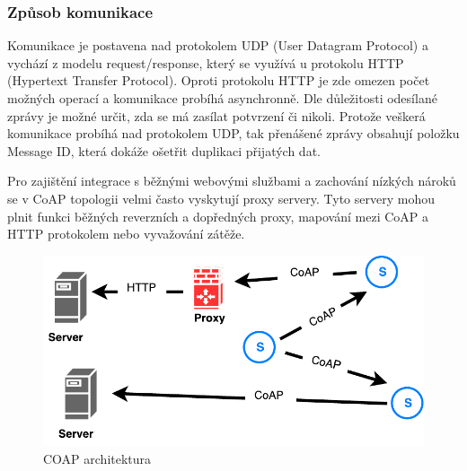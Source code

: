    \subsubsection{Způsob komunikace}
   Komunikace je postavena nad protokolem UDP (User Datagram Protocol) a vychází
   z modelu request/response, který se využívá u protokolu HTTP (Hypertext
   Transfer Protocol). Oproti protokolu HTTP je zde omezen počet možných operací
   a komunikace probíhá asynchronně. Dle důležitosti odesílané zprávy je možné určit,
   zda se má zasílat potvrzení či nikoli. Protože veškerá komunikace probíhá nad
   protokolem UDP, tak přenášené zprávy obsahují položku Message ID, která dokáže
   ošetřit duplikaci přijatých dat.
   
   Pro zajištění integrace s běžnými webovými službami a zachování nízkých nároků
   se v CoAP topologii velmi často vyskytují proxy servery. Tyto servery mohou plnit
   funkci běžných reverzních a dopředných proxy, mapování mezi CoAP a HTTP protokolem
   nebo vyvažování zátěže. 
   
   \begin{figure}[ht]
   \begin{center}
   \includegraphics[scale=0.38]{pictures/coap-arch}
   \caption{COAP architektura}
   \label{obr.coap-arch}
   \end{center}
   \end{figure}
   
